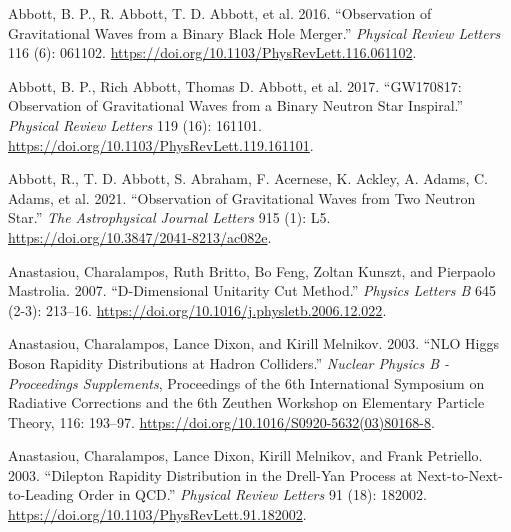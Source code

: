 \documentclass[
  11pt,
  a4paper,
  DIV=11,
  numbers=noendperiod,
  oneside]{scrreprt}
\newlength{\cslhangindent}
\newlength{\cslentryspacingunit} %
\newenvironment{CSLReferences}[2] %
 {%
  \setlength{\parindent}{0pt}
  \ifodd #1
  \let\oldpar\par
  \def\par{\hangindent=\cslhangindent\oldpar}
  \fi
  \setlength{\parskip}{#2\cslentryspacingunit}
 }%
 {}
\DeclareRobustCommand{\[}{\begin{equation}}
\DeclareRobustCommand{\]}{\end{equation}}
\begin{document}
\hypertarget{refs}{}
\begin{CSLReferences}{1}{0}
\begin{figure}

\end{figure}

\leavevmode{}%
Abbott, B. P., R. Abbott, T. D. Abbott, et al. 2016. {``Observation of
{Gravitational Waves} from a {Binary Black Hole Merger}.''}
\emph{Physical Review Letters} 116 (6): 061102.
\url{https://doi.org/10.1103/PhysRevLett.116.061102}.

\leavevmode{}%
Abbott, B. P., Rich Abbott, Thomas D. Abbott, et al. 2017.
{``{GW170817}: {Observation} of {Gravitational Waves} from a {Binary
Neutron Star Inspiral}.''} \emph{Physical Review Letters} 119 (16):
161101. \url{https://doi.org/10.1103/PhysRevLett.119.161101}.

\leavevmode{}%
Abbott, R., T. D. Abbott, S. Abraham, F. Acernese, K. Ackley, A. Adams,
C. Adams, et al. 2021. {``Observation of {Gravitational Waves} from {Two
Neutron Star}.''} \emph{The
Astrophysical Journal Letters} 915 (1): L5.
\url{https://doi.org/10.3847/2041-8213/ac082e}.

\leavevmode{}%
Anastasiou, Charalampos, Ruth Britto, Bo Feng, Zoltan Kunszt, and
Pierpaolo Mastrolia. 2007. {``D-Dimensional Unitarity Cut Method.''}
\emph{Physics Letters B} 645 (2-3): 213--16.
\url{https://doi.org/10.1016/j.physletb.2006.12.022}.

\leavevmode{}%
Anastasiou, Charalampos, Lance Dixon, and Kirill Melnikov. 2003. {``{NLO
Higgs} Boson Rapidity Distributions at Hadron Colliders.''}
\emph{Nuclear Physics B - Proceedings Supplements}, Proceedings of the
6th {International Symposium} on {Radiative Corrections} and the 6th
{Zeuthen Workshop} on {Elementary Particle Theory}, 116: 193--97.
\url{https://doi.org/10.1016/S0920-5632(03)80168-8}.

\leavevmode{}%
Anastasiou, Charalampos, Lance Dixon, Kirill Melnikov, and Frank
Petriello. 2003. {``Dilepton {Rapidity Distribution} in the {Drell-Yan
Process} at {Next-to-Next-to-Leading Order} in {QCD}.''} \emph{Physical
Review Letters} 91 (18): 182002.
\url{https://doi.org/10.1103/PhysRevLett.91.182002}.


\end{CSLReferences}
\end{document}
